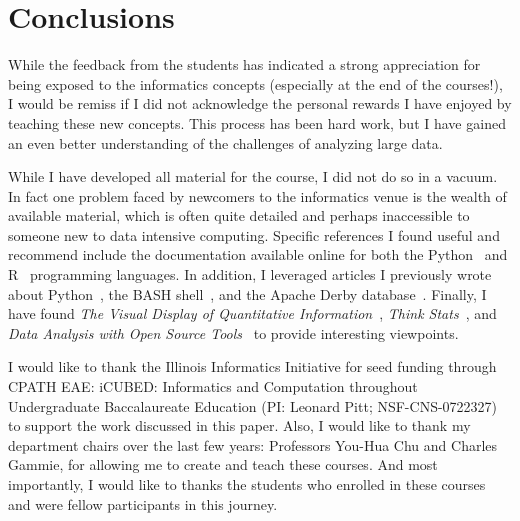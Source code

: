 \section{Conclusions}
While the feedback from the students has indicated a strong appreciation for being exposed to the informatics concepts (especially at the end of the courses!), I would be remiss if I did not acknowledge the personal rewards I have enjoyed by teaching these new concepts. This process has been hard work, but I have gained an even better understanding of the challenges of analyzing large data.

While I have developed all material for the course, I did not do so in a vacuum. In fact one problem faced by newcomers to the informatics venue is the wealth of available material, which is often quite detailed and perhaps inaccessible to someone new to data intensive computing. Specific references I found useful and recommend include the documentation available online for both the Python~\citep{python} and R~\citep{rproject} programming languages. In addition, I leveraged articles I previously wrote about Python~\citep{rjbpython}, the BASH shell~\citep{rjbbash}, and the Apache Derby database~\citep{rjbderby}. Finally, I have found {\em The Visual Display of Quantitative Information}~\citep{tufte09}, {\em Think Stats}~\citep{downey11}, and {\em Data Analysis with Open Source Tools}~\citep{janert10} to provide interesting viewpoints. 

\acknowledgements I would like to thank the Illinois Informatics Initiative for seed funding through CPATH EAE: iCUBED: Informatics and Computation throughout Undergraduate Baccalaureate Education (PI: Leonard Pitt; NSF-CNS-0722327) to support the work discussed in this paper. Also, I would like to thank my department chairs over the last few years: Professors You-Hua Chu and Charles Gammie, for allowing me to create and teach these courses. And most importantly, I would like to thanks the students who enrolled in these courses and were fellow participants in this journey.





